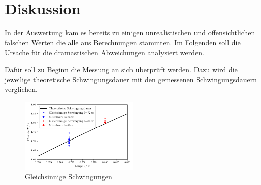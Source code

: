 \section{Diskussion}
\label{sec:Diskussion}

In der Auswertung kam es bereits zu einigen unrealistischen und offensichtlichen
falschen Werten die alle aus Berechnungen stammten.
Im Folgenden soll die Ursache für die dramastischen Abweichungen analysiert werden.


Dafür soll zu Beginn die Messung an sich überprüft werden.
Dazu wird die jeweilige theoretische Schwingungsdauer mit den gemessenen Schwingungsdauern verglichen.
\begin{figure}
    \centering
    \includegraphics[width=0.5\textwidth]{plots/plot1.pdf}
    \caption{Gleichsinnige Schwingungen}
\end{figure}

